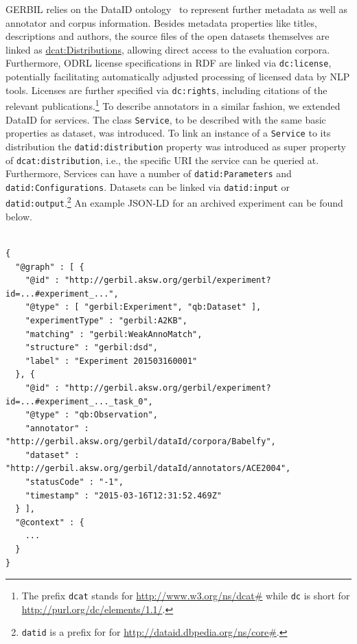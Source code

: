 GERBIL relies on the DataID ontology~\cite{dataID} to represent further metadata as well as annotator and corpus information. 
Besides metadata properties like titles, descriptions and authors, the source files of the open datasets themselves are linked as \url{dcat:Distributions}, allowing direct access to the evaluation corpora. 
Furthermore, ODRL license specifications in RDF are linked via \texttt{dc:license}, potentially facilitating automatically adjusted processing of licensed data by NLP tools. 
Licenses are further specified via \texttt{dc:rights}, including citations of the relevant publications.\footnote{The prefix \texttt{dcat} stands for \url{http://www.w3.org/ns/dcat\#} while \texttt{dc} is short for \url{http://purl.org/dc/elements/1.1/}.}
To describe annotators in a similar fashion, we extended DataID for services. 
The class \texttt{Service}, to be described with the same basic properties as dataset, was introduced. 
To link an instance of a \texttt{Service} to its distribution the \texttt{datid:distribution} property was introduced as super property of \texttt{dcat:distribution}, i.e., the specific URI the service can be queried at.
Furthermore, Services can have a number of \texttt{datid:Parameters} and \texttt{datid:Configurations}.
Datasets can be linked via \texttt{datid:input} or \texttt{datid:output}.\footnote{\texttt{datid} is a prefix for for \url{http://dataid.dbpedia.org/ns/core\#}.} 
An example JSON-LD for an archived experiment can be found below.


\scriptsize
\begin{verbatim}

{
  "@graph" : [ {
    "@id" : "http://gerbil.aksw.org/gerbil/experiment?id=...#experiment_...",
    "@type" : [ "gerbil:Experiment", "qb:Dataset" ],
    "experimentType" : "gerbil:A2KB",
    "matching" : "gerbil:WeakAnnoMatch",
    "structure" : "gerbil:dsd",
    "label" : "Experiment 201503160001"
  }, {
    "@id" : "http://gerbil.aksw.org/gerbil/experiment?id=...#experiment_..._task_0",
    "@type" : "qb:Observation",
    "annotator" : "http://gerbil.aksw.org/gerbil/dataId/corpora/Babelfy",
    "dataset" : "http://gerbil.aksw.org/gerbil/dataId/annotators/ACE2004",
    "statusCode" : "-1",
    "timestamp" : "2015-03-16T12:31:52.469Z"
  } ],
  "@context" : {
    ...
  }
}
\end{verbatim}
\normalsize


